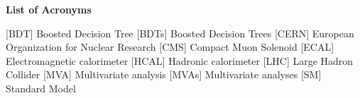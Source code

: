 



\listoffigures
\listoftables


\newpage
\thispagestyle{empty}
{}
\vspace*{1.95cm} \hspace*{-0.155cm} %
\textbf{{\huge \sffamily List of Acronyms}\\}
\vspace*{0.5cm} 
\begin{acronym}[AAAAAAA]
 [BDT] {Boosted Decision Tree}
 [BDTs] {Boosted Decision Trees}
 [CERN] {European Organization for Nuclear Research}
 [CMS] {Compact Muon Solenoid}
 [ECAL] {Electromagnetic calorimeter}
 [HCAL] {Hadronic calorimeter}
 [LHC] {Large Hadron Collider}
 [MVA] {Multivariate analysis}
 [MVAs] {Multivariate analyses}
 [SM] {Standard Model}
\end{acronym}


